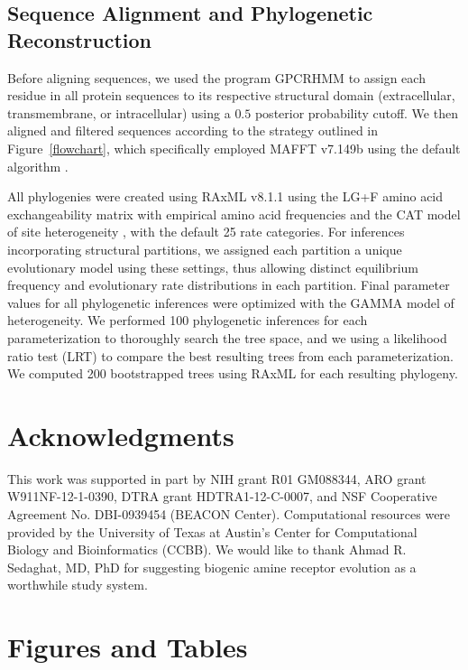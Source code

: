 \documentclass[fleqn,10pt]{wlpeerj}
\begin{document}
\subsection*{Sequence Alignment and Phylogenetic Reconstruction}
Before aligning sequences, we used the program GPCRHMM \citep{Wistrand2006} to assign each residue in all protein sequences to its respective structural domain (extracellular, transmembrane, or intracellular) using a $0.5$ posterior probability cutoff. We then aligned and filtered sequences according to the strategy outlined in Figure~\ref{flowchart}, which specifically employed MAFFT v7.149b using the default algorithm \citep{mafftv7}. 

All phylogenies were created using RAxML v8.1.1 \citep{raxml} using the LG+F \citep{LG} amino acid exchangeability matrix with empirical amino acid frequencies and the CAT model of site heterogeneity \citep{Stamatakis2006}, with the default 25 rate categories. For inferences incorporating structural partitions, we assigned each partition a unique evolutionary model using these settings, thus allowing distinct equilibrium frequency and evolutionary rate distributions in each partition. Final parameter values for all phylogenetic inferences were optimized with the GAMMA model of heterogeneity. We performed 100 phylogenetic inferences for each parameterization to thoroughly search the tree space, and we using a likelihood ratio test (LRT) to compare the best resulting trees from each parameterization. We computed 200 bootstrapped trees using RAxML for each resulting phylogeny.


\section*{Acknowledgments}
This work was supported in part by NIH grant R01 GM088344, ARO grant W911NF-12-1-0390, DTRA grant HDTRA1-12-C-0007, and NSF Cooperative Agreement No. DBI-0939454 (BEACON Center).  Computational resources were provided by the University of Texas at Austin's Center for Computational Biology and Bioinformatics (CCBB). We would like to thank Ahmad R. Sedaghat, MD, PhD for suggesting biogenic amine receptor evolution as a worthwhile study system.





\newpage


\section*{Figures and Tables}
\end{document}
